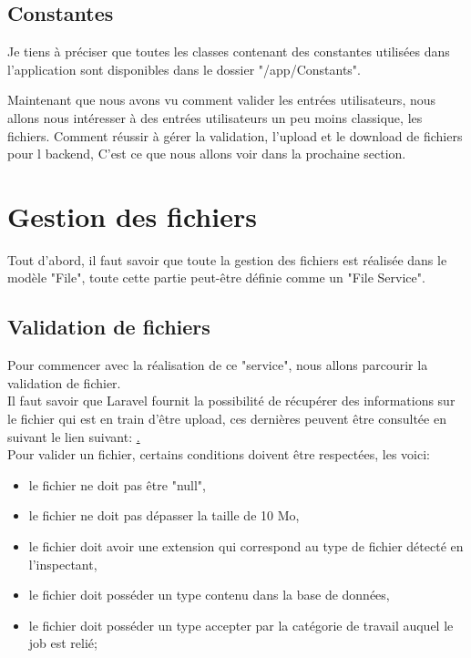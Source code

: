 \documentclass[
    iai, %
    il, %
]{heig-tb}
\begin{document}
\subsection{Constantes}
Je tiens à préciser que toutes les classes contenant des constantes utilisées dans l'application sont disponibles dans le dossier "/app/Constants".

Maintenant que nous avons vu comment valider les entrées utilisateurs, nous allons nous intéresser à des entrées utilisateurs un peu moins classique, les fichiers. Comment réussir à gérer la validation, l'upload et le download de fichiers pour l \Gls{backend}, C'est ce que nous allons voir dans la prochaine section.

\section{Gestion des fichiers}
Tout d'abord, il faut savoir que toute la gestion des fichiers est réalisée dans le modèle "File", toute cette partie peut-être définie comme un "File Service".

\subsection{Validation de fichiers}

Pour commencer avec la réalisation de ce "service", nous allons parcourir la validation de fichier. \\
Il faut savoir que Laravel fournit la possibilité de récupérer des informations sur le fichier qui est en train d'être upload, ces dernières peuvent être consultée en suivant le lien suivant: \href{https://laravel.com/docs/9.x/filesystem#other-uploaded-file-information}. \\

Pour valider un fichier, certains conditions doivent être respectées, les voici:
\begin{itemize}
    \item le fichier ne doit pas être "null",
    \item le fichier ne doit pas dépasser la taille de 10 Mo,
    \item le fichier doit avoir une extension qui correspond au type de fichier détecté en l'inspectant,
    \item le fichier doit posséder un type contenu dans la base de données,
    \item le fichier doit posséder un type accepter par la catégorie de travail auquel le job est relié;
\end{itemize}
\end{document}
